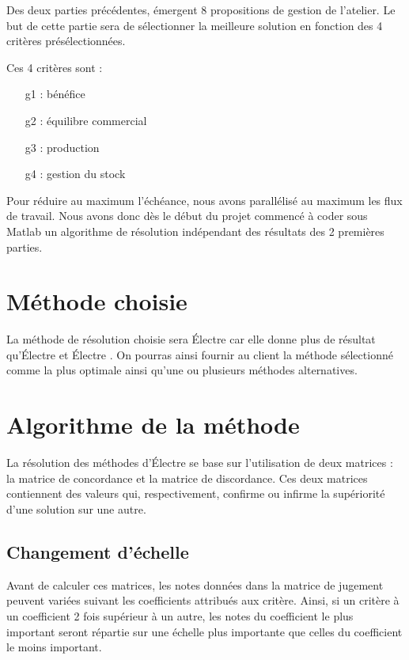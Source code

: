 
Des deux parties précédentes, émergent 8 propositions de gestion de l'atelier.
Le but de cette partie sera de sélectionner la meilleure solution en fonction des 4 critères présélectionnées.

Ces 4 critères sont :
\begin{itemize}
\item[g1] : bénéfice
\item[g2] : équilibre commercial
\item[g3] : production
\item[g4] : gestion du stock
\end{itemize}

Pour réduire au maximum l'échéance, nous avons parallélisé au maximum les flux de travail.
Nous avons donc dès le début du projet commencé à coder sous Matlab un
algorithme de résolution indépendant des résultats des 2 premières parties.

\section{Méthode choisie}

La méthode de résolution choisie sera Électre  car elle donne plus de résultat qu'Électre  et Électre .
On pourras ainsi fournir au client la méthode sélectionné comme la plus optimale ainsi qu'une ou plusieurs méthodes alternatives.

\section{Algorithme de la méthode}

La résolution des méthodes d'Électre se base sur l'utilisation de deux matrices : la matrice de concordance et la matrice de discordance.
Ces deux matrices contiennent des valeurs qui, respectivement, confirme ou infirme la supériorité d'une solution sur une autre.\\
\subsection{Changement d'échelle}
Avant de calculer ces matrices, les notes données dans la matrice de jugement peuvent variées suivant les coefficients attribués aux critère. Ainsi, si un critère à un coefficient 2 fois supérieur à un autre, les notes du coefficient le plus important seront répartie sur une échelle plus importante que celles du coefficient le moins important.

